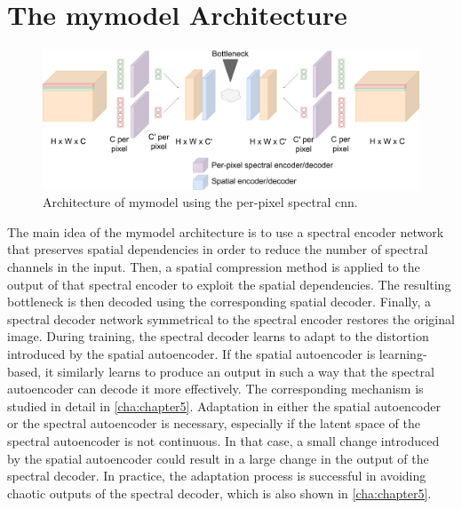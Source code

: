 \section{The \ac{mymodel} Architecture\label{sec:combinedmodel}}
\begin{figure}
\centering
\includegraphics[scale=0.18]{img/GeneralArchitecture.pdf}
\caption[\ac{mymodel} Architecture]{Architecture of \ac{mymodel} using the per-pixel spectral \ac{cnn}.}
\label{fig:combined}
\end{figure}

The main idea of the \ac{mymodel} architecture is to use a spectral encoder network that preserves spatial dependencies in order to reduce the number of spectral channels in the input. Then, a spatial compression method is applied to the output of that spectral encoder to exploit the spatial dependencies. The resulting bottleneck is then decoded using the corresponding spatial decoder. Finally, a spectral decoder network symmetrical to the spectral encoder restores the original image. During training, the spectral decoder learns to adapt to the distortion introduced by the spatial autoencoder. If the spatial autoencoder is learning-based, it similarly learns to produce an output in such a way that the spectral autoencoder can decode it more effectively. The corresponding mechanism is studied in detail in \autoref{cha:chapter5}. Adaptation in either the spatial autoencoder or the spectral autoencoder is necessary, especially if the latent space of the spectral autoencoder is not continuous. In that case, a small change introduced by the spatial autoencoder could result in a large change in the output of the spectral decoder. In practice, the adaptation process is successful in avoiding chaotic outputs of the spectral decoder, which is also shown in \autoref{cha:chapter5}.

